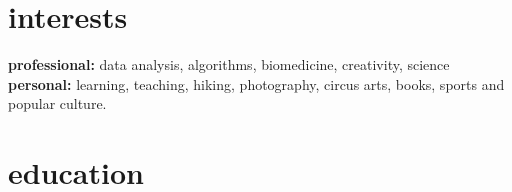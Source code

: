 \documentclass[]{friggeri-cv} %
\begin{document}
\section{interests}

\textbf{professional:} data analysis, algorithms, biomedicine,
creativity, science \textbf{personal:} learning, teaching, hiking, photography,
circus arts, books, sports and popular culture.


\section{education}
\end{document}
